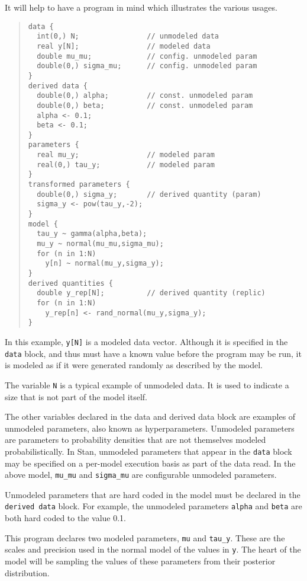 \documentclass[10pt]{report}
\newcommand{\Stan}{Stan\xspace}
\newcommand{\code}[1]{{\tt #1}}
\begin{document}
It will help to have a program in mind which illustrates the various
usages.  
%
\begin{quote}
\begin{Verbatim}
data {
  int(0,) N;                // unmodeled data
  real y[N];                // modeled data
  double mu_mu;             // config. unmodeled param
  double(0,) sigma_mu;      // config. unmodeled param
}
derived data {
  double(0,) alpha;         // const. unmodeled param
  double(0,) beta;          // const. unmodeled param
  alpha <- 0.1;       
  beta <- 0.1;
} 
parameters {
  real mu_y;                // modeled param
  real(0,) tau_y;           // modeled param
} 
transformed parameters {
  double(0,) sigma_y;       // derived quantity (param)
  sigma_y <- pow(tau_y,-2);
}
model {
  tau_y ~ gamma(alpha,beta);
  mu_y ~ normal(mu_mu,sigma_mu);
  for (n in 1:N)
    y[n] ~ normal(mu_y,sigma_y);
}
derived quantities {
  double y_rep[N];          // derived quantity (replic)
  for (n in 1:N)
    y_rep[n] <- rand_normal(mu_y,sigma_y);
}
\end{Verbatim}
\end{quote}
%
In this example, \code{y[N]} is a modeled data vector.  Although it is
specified in the \code{data} block, and thus must have a known value
before the program may be run, it is modeled as if it were generated
randomly as described by the model.  

The variable \code{N} is a typical example of unmodeled data.  It is
used to indicate a size that is not part of the model itself.

The other variables declared in the data and derived data block are
examples of unmodeled parameters, also known as hyperparameters.
Unmodeled parameters are parameters to probability densities that are
not themselves modeled probabilistically.  In \Stan, unmodeled
parameters that appear in the \code{data} block may be specified on a
per-model execution basis as part of the data read.  In the above
model, \code{mu\_mu} and \code{sigma\_mu} are configurable unmodeled
parameters.  

Unmodeled parameters that are hard coded in the model must 
be declared in the \code{derived data} block.  For example, the
unmodeled parameters \code{alpha} and \code{beta} are both hard coded
to the value 0.1. 

This program declares two modeled parameters, \code{mu} and
\code{tau\_y}.  These are the scales and precision used in the normal
model of the values in \code{y}.  The heart of the model will be
sampling the values of these parameters from their posterior
distribution.
\end{document}
